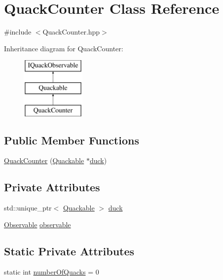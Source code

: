 \hypertarget{classQuackCounter}{\section{Quack\-Counter Class Reference}
\label{classQuackCounter}
}


{\ttfamily \#include $<$Quack\-Counter.\-hpp$>$}

Inheritance diagram for Quack\-Counter\-:\begin{figure}[H]
\begin{center}
\leavevmode
\includegraphics[height=3.000000cm]{classQuackCounter}
\end{center}
\end{figure}
\subsection*{Public Member Functions}
\begin{DoxyCompactItemize}
\item 
\hyperlink{classQuackCounter_abcaaa010f4f16a2948aaeddacafe7eb8}{Quack\-Counter} (\hyperlink{classQuackable}{Quackable} $\ast$\hyperlink{classQuackCounter_ad3d5690807efd62ecd5045e45e05ae9d}{duck})
\end{DoxyCompactItemize}
\subsection*{Private Attributes}
\begin{DoxyCompactItemize}
\item 
std\-::unique\-\_\-ptr$<$ \hyperlink{classQuackable}{Quackable} $>$ \hyperlink{classQuackCounter_ad3d5690807efd62ecd5045e45e05ae9d}{duck}
\item 
\hyperlink{classObservable}{Observable} \hyperlink{classQuackCounter_a87ae3d63f7a9c240fd3f771b30292270}{observable}
\end{DoxyCompactItemize}
\subsection*{Static Private Attributes}
\begin{DoxyCompactItemize}
\item 
static int \hyperlink{classQuackCounter_a8d4bf6fc94ce9aace25559b8f233acb6}{number\-Of\-Quacks} = 0
\end{DoxyCompactItemize}


